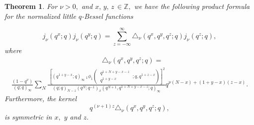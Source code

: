 \documentclass[12pt,a4paper]{amsart}
\numberwithin{equation}{section}
\theoremstyle{plain}
\newtheorem{theorem}{Theorem}[section]
\theoremstyle{definition}
\theoremstyle{remark}
\numberwithin{equation}{section}
\numberwithin{table}{section}
\numberwithin{figure}{section}
\begin{document}
\begin{theorem} For $\nu >0,$ and $x,\,y,\,z\,\in \mathbb{Z},$ we
have the following product formula for the normalized little
$q$-Bessel functions

\begin{equation}
j_{\nu}(q^x;q)j_{\nu}(q^y;q)=\sum_{z=-\infty}^{\infty}\triangle_{\nu}(q^x,q^y,q^z;q)j_{\nu}(q^z;q),\label{besp}
\end{equation}
where
\begin{align}
&\triangle_{\nu}(q^x,q^y,q^z;q)= \label{delta}
\end{align}
\begin{align*}
\frac{(1-q^{\nu})}{(q;q)_{\infty}} \sum_{N}\frac{\,\left[(q^{1+y-x};q)_{\infty}\ _{1}\phi_1\left(\begin{matrix} \ q^{1+N+y-x-z}\  \\
\ q^{1+y-x}\end{matrix};q,q^{1+z-x}\right)
\right]^2
}{(q;q)_{N-z}(q^{N};q^{-1})_{x}(q^{N+1},q^{1+N+y-x-z};q)_{\infty}}
q^{\nu(N-x)+(1+y-x)(z-x)}.
\end{align*}
Furthermore, the kernel
\begin{equation}
q^{(\nu+1)z}\triangle_{\nu}(q^x,q^y,q^z;q),\label{kern}
\end{equation} is symmetric in $x,$
$y$ and $z.$
\end{theorem}
\end{document}
